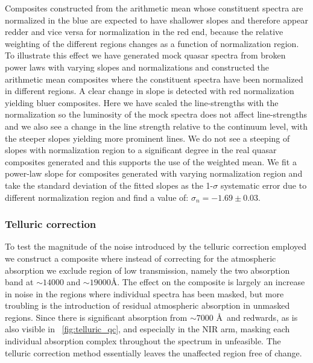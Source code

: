 \documentclass{aa}    %
\newcommand{\figref}[1]{\ref{fig:#1}}
\newcommand{\Fig}[1]{\figurename~\figref{#1}}
\newcommand{\fig}[1]{\Fig{#1}}
\newcommand{\figlabel}[1]{\label{fig:#1}}
\newcommand{\sectlabel}[1]{\label{sect:#1}}
\newcommand{\todo}[3]{{\color{#2}\emph{#1}: #3}}
\newcommand{\jstodo}[1]{\todo{TODO }{green}{#1}}
\begin{document}
{Composites constructed from the arithmetic mean whose constituent spectra are normalized in the blue are expected to have shallower slopes and therefore appear redder and vice versa for normalization in the red end, because the relative weighting of the different regions changes as a function of normalization region. To illustrate this effect we have generated mock quasar spectra from broken power laws with varying slopes and normalizations and constructed the arithmetic mean composites where the constituent spectra have been normalized in different regions. 
 A clear change in slope is detected with red normalization yielding bluer composites. Here we have scaled the line-strengths with the normalization so the luminosity of the mock spectra does not affect line-strengths and we also see a change in the line strength relative to the continuum level, with the steeper slopes yielding more prominent lines. We do not see a steeping of slopes with normalization region to a significant degree in the real quasar composites generated and this supports the use of the weighted mean. We fit a power-law slope for composites generated with varying normalization region and take the standard deviation of the fitted slopes as the 1-$\sigma$ systematic error due to different normalization region and find a value of: $\sigma_{n} = -1.69 \pm 0.03$.



\subsubsection{Telluric correction}  \sectlabel{Telluric correction}
To test the magnitude of the noise introduced by the telluric correction employed we construct a composite where instead of correcting for the atmospheric absorption we exclude region of low transmission, namely the two absorption band at $\sim 14000$ and $\sim 19000$\AA. The effect on the composite is largely an increase in noise in the regions where individual spectra has been masked, but more troubling is the introduction of residual atmospheric absorption in unmasked regions. Since there is significant absorption from $\sim 7000$ \AA~and redwards, as is also visible in \fig{telluric_qc}, and especially in the NIR arm, masking each individual absorption complex throughout the spectrum in unfeasible. The telluric correction method essentially leaves the unaffected region free of change. 


}
\end{document}
